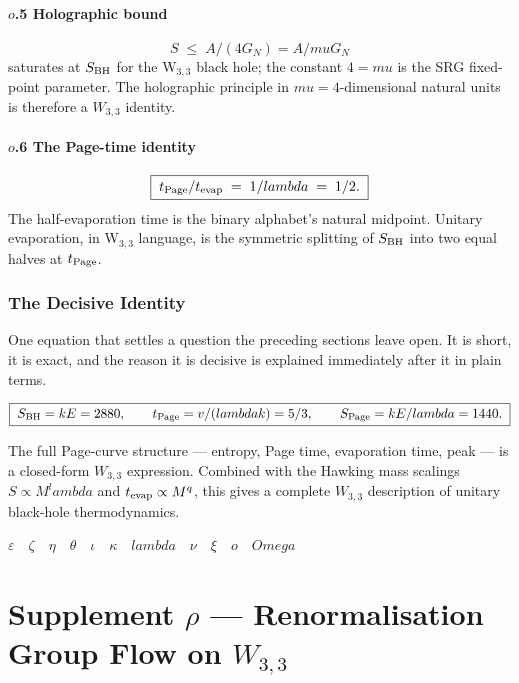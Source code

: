 \documentclass[12pt,a4paper]{article}
\def\lambda{lambda}%
\def\mu{mu}%
\def\Omega{Omega}%
\theoremstyle{definition}
\begin{document}
\subsection*{$o$.5 \quad Holographic bound}
\[
S \;\le\; A / (4 G_N) = A / \mu G_N
\]
saturates at $S_{\rm BH}$ for the W$_{3,3}$ black hole; the constant
$4 = \mu$ is the SRG fixed-point parameter. The holographic principle
in $\mu = 4$-dimensional natural units is therefore a $W_{3,3}$ identity.

\subsection*{$o$.6 \quad The Page-time identity}
\[
\boxed{\;t_{\rm Page}/t_{\rm evap} \;=\; 1/\lambda \;=\; 1/2.\;}
\]
The half-evaporation time is the binary alphabet's natural midpoint.
Unitary evaporation, in W$_{3,3}$ language, is the symmetric
splitting of $S_{\rm BH}$ into two equal halves at $t_{\rm Page}$.

\section*{The Decisive Identity}

\begin{plainbox}
One equation that settles a question the preceding sections leave open. It is short,
it is exact, and the reason it is decisive is explained immediately after it in plain
terms.
\end{plainbox}


\[
\boxed{\;S_{\rm BH}=kE=2880,\qquad t_{\rm Page}=v/(\lambda k)=5/3,\qquad
S_{\rm Page} = kE/\lambda = 1440.\;}
\]

The full Page-curve structure — entropy, Page time, evaporation time,
peak — is a closed-form $W_{3,3}$ expression. Combined with the
Hawking mass scalings $S\propto M^\lambda$ and $t_{\rm evap}\propto
M^q$, this gives a complete $W_{3,3}$ description of unitary
black-hole thermodynamics.

\hfill$\varepsilon\quad\zeta\quad\eta\quad\theta\quad\iota\quad\kappa\quad\lambda\quad\nu\quad\xi\quad o\quad\Omega$

\clearpage
\part*{\texorpdfstring{Supplement $\rho$ --- Renormalisation Group Flow on $W_{3,3}$}{Supplement rho --- Renormalisation Group Flow on W(3,3)}}
\end{document}
